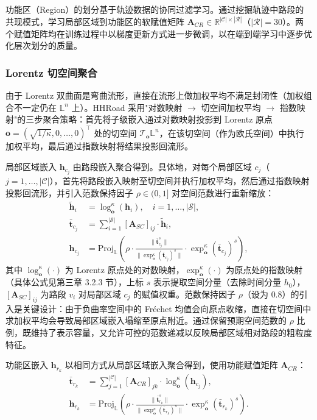 功能区（Region）的划分基于轨迹数据的协同过滤学习。通过挖掘轨迹中路段的共现模式，学习局部区域到功能区的软赋值矩阵 $\mathbf{A}_{CR} \in \mathbb{R}^{|\mathcal{C}| \times |\mathcal{R}|}$（$|\mathcal{R}|=30$）。两个赋值矩阵均在训练过程中以梯度更新方式进一步微调，以在端到端学习中逐步优化层次划分的质量。

\subsubsection{Lorentz 切空间聚合}

由于 Lorentz 双曲面是弯曲流形，直接在流形上做加权平均不满足封闭性（加权组合不一定仍在 $\mathbb{L}^n$ 上）。HHRoad 采用"对数映射 $\to$ 切空间加权平均 $\to$ 指数映射"的三步聚合策略：首先将子级嵌入通过对数映射投影到 Lorentz 原点 $\mathbf{o} = (\sqrt{1/\kappa}, 0, \ldots, 0)^\top$ 处的切空间 $\mathcal{T}_\mathbf{o}\mathbb{L}^n$，在该切空间（作为欧氏空间）中执行加权平均，最后通过指数映射将结果投影回流形。

局部区域嵌入 $\mathbf{h}_{c_j}$ 由路段嵌入聚合得到。具体地，对每个局部区域 $c_j$（$j = 1, \dots, |\mathcal{C}|$），首先将路段嵌入映射至切空间并执行加权平均，然后通过指数映射投影回流形，并引入范数保持因子 $\rho \in (0,1]$ 对空间范数进行重新缩放：
\begin{align}
    \tilde{\mathbf{h}}_i &= \log_{\mathbf{o}}^\kappa(\mathbf{h}_i), \quad i = 1, \dots, |\mathcal{S}|, \label{eq:seg_to_tangent} \\[3pt]
    \bar{\mathbf{t}}_{c_j} &= \sum_{i=1}^{|\mathcal{S}|} [\mathbf{A}_{SC}]_{ij} \cdot \tilde{\mathbf{h}}_i, \label{eq:tangent_mean_loc} \\[3pt]
    \mathbf{h}_{c_j} &= \text{Proj}_{\mathbb{L}}\!\left(
      \rho \cdot \frac{\|\bar{\mathbf{t}}_{c_j}^s\|}{\|\exp_{\mathbf{o}}^\kappa(\bar{\mathbf{t}}_{c_j})^s\|}
      \cdot \exp_{\mathbf{o}}^\kappa(\bar{\mathbf{t}}_{c_j})^s
    \right), \label{eq:locality_agg}
\end{align}
其中 $\log_{\mathbf{o}}^\kappa(\cdot)$ 为 Lorentz 原点处的对数映射，$\exp_{\mathbf{o}}^\kappa(\cdot)$ 为原点处的指数映射（具体公式见第三章 3.2.3 节），上标 $s$ 表示提取空间分量（去除时间分量 $h_0$），$[\mathbf{A}_{SC}]_{ij}$ 为路段 $v_i$ 对局部区域 $c_j$ 的赋值权重。范数保持因子 $\rho$（设为 $0.8$）的引入是关键设计：由于负曲率空间中的 Fréchet 均值会向原点收缩，直接在切空间中求加权平均会导致局部区域嵌入塌缩至原点附近。通过保留预期空间范数的 $\rho$ 比例，既维持了表示容量，又允许可控的范数递减以反映局部区域相对路段的粗粒度特征。

功能区嵌入 $\mathbf{h}_{r_k}$ 以相同方式从局部区域嵌入聚合得到，使用功能赋值矩阵 $\mathbf{A}_{CR}$：
\begin{align}
    \bar{\mathbf{t}}_{r_k} &= \sum_{j=1}^{|\mathcal{C}|} [\mathbf{A}_{CR}]_{jk} \cdot \log_{\mathbf{o}}^\kappa(\mathbf{h}_{c_j}), \label{eq:tangent_mean_reg} \\[3pt]
    \mathbf{h}_{r_k} &= \text{Proj}_{\mathbb{L}}\!\left(
      \rho \cdot \frac{\|\bar{\mathbf{t}}_{r_k}^s\|}{\|\exp_{\mathbf{o}}^\kappa(\bar{\mathbf{t}}_{r_k})^s\|}
      \cdot \exp_{\mathbf{o}}^\kappa(\bar{\mathbf{t}}_{r_k})^s
    \right). \label{eq:region_agg}
\end{align}

